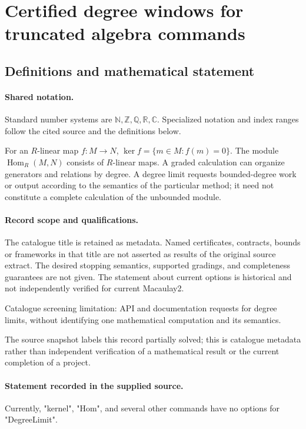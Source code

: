 \documentclass[11pt]{article}
\begin{document}
\section{Certified degree windows for truncated algebra commands}\label{statement}

\subsection{Definitions and mathematical statement}

\paragraph{Shared notation.}Standard number systems are $\mathbb N,\mathbb Z,\mathbb Q,\mathbb R,\mathbb C$. Specialized notation and index ranges follow the cited source and the definitions below.


For an $R$-linear map $f:M\to N$, $\ker f=\{m\in M:f(m)=0\}$. The module $\operatorname{Hom}_R(M,N)$ consists of $R$-linear maps. A graded calculation can organize generators and relations by degree. A degree limit requests bounded-degree work or output according to the semantics of the particular method; it need not constitute a complete calculation of the unbounded module.
\paragraph{Record scope and qualifications.}
The catalogue title is retained as metadata. Named certificates, contracts, bounds or frameworks in that title are not asserted as results of the original source extract.
The desired stopping semantics, supported gradings, and completeness guarantees are not given. The statement about current options is historical and not independently verified for current Macaulay2.

Catalogue screening limitation: API and documentation requests for degree limits, without identifying one mathematical computation and its semantics.

The source snapshot labels this record partially solved; this is catalogue metadata rather than independent verification of a mathematical result or the current completion of a project.
\paragraph{Statement recorded in the supplied source.}
Currently, "kernel", "Hom", and several other commands have no options for "DegreeLimit".
\end{document}

